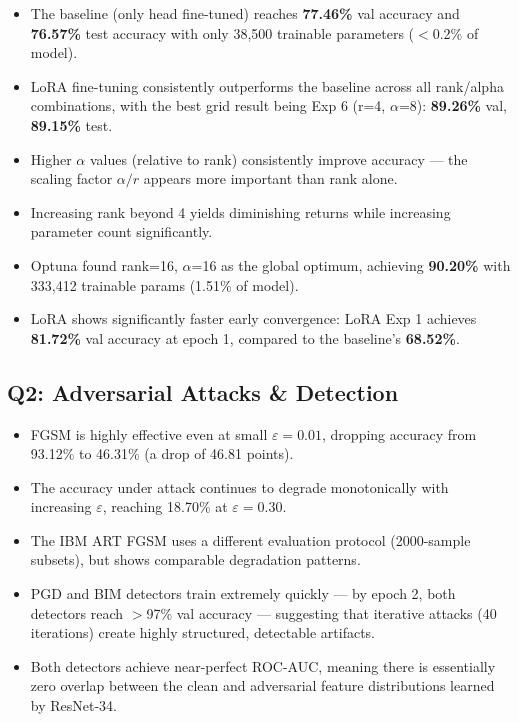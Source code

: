 \documentclass[12pt,a4paper]{article}
\begin{document}
\begin{itemize}
    \item The baseline (only head fine-tuned) reaches \textbf{77.46\%} val accuracy and \textbf{76.57\%} test accuracy with only 38,500 trainable parameters ($<$0.2\% of model).
    \item LoRA fine-tuning consistently outperforms the baseline across all rank/alpha combinations, with the best grid result being Exp 6 (r=4, $\alpha$=8): \textbf{89.26\%} val, \textbf{89.15\%} test.
    \item Higher $\alpha$ values (relative to rank) consistently improve accuracy — the scaling factor $\alpha/r$ appears more important than rank alone.
    \item Increasing rank beyond 4 yields diminishing returns while increasing parameter count significantly.
    \item Optuna found rank=16, $\alpha$=16 as the global optimum, achieving \textbf{90.20\%} with 333,412 trainable params (1.51\% of model).
    \item LoRA shows significantly faster early convergence: LoRA Exp 1 achieves \textbf{81.72\%} val accuracy at epoch 1, compared to the baseline's \textbf{68.52\%}.
\end{itemize}

\subsection{Q2: Adversarial Attacks \& Detection}

\begin{itemize}
    \item FGSM is highly effective even at small $\varepsilon = 0.01$, dropping accuracy from 93.12\% to 46.31\% (a drop of 46.81 points).
    \item The accuracy under attack continues to degrade monotonically with increasing $\varepsilon$, reaching 18.70\% at $\varepsilon = 0.30$.
    \item The IBM ART FGSM uses a different evaluation protocol (2000-sample subsets), but shows comparable degradation patterns.
    \item PGD and BIM detectors train extremely quickly — by epoch 2, both detectors reach $>$97\% val accuracy — suggesting that iterative attacks (40 iterations) create highly structured, detectable artifacts.
    \item Both detectors achieve near-perfect ROC-AUC, meaning there is essentially zero overlap between the clean and adversarial feature distributions learned by ResNet-34.
\end{itemize}
\end{document}
